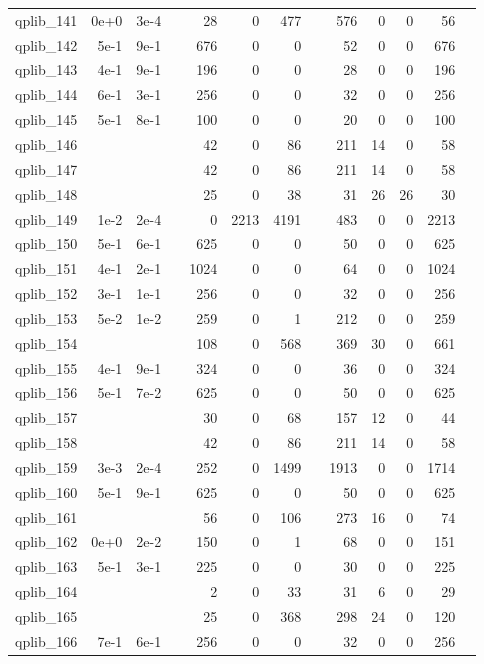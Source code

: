 \begin{table}
\begin{tabular}{lrrrrrrrrrrrr}
qplib\_141	&	0e+0	&	3e-4	&	&	28	&	0	&	477	&	&	576	&	0	&	0	&	56	\\
qplib\_142	&	5e-1	&	9e-1	&	&	676	&	0	&	0	&	&	52	&	0	&	0	&	676	\\
qplib\_143	&	4e-1	&	9e-1	&	&	196	&	0	&	0	&	&	28	&	0	&	0	&	196	\\
qplib\_144	&	6e-1	&	3e-1	&	&	256	&	0	&	0	&	&	32	&	0	&	0	&	256	\\
qplib\_145	&	5e-1	&	8e-1	&	&	100	&	0	&	0	&	&	20	&	0	&	0	&	100	\\
qplib\_146	&		&		&	&	42	&	0	&	86	&	&	211	&	14	&	0	&	58	\\
qplib\_147	&		&		&	&	42	&	0	&	86	&	&	211	&	14	&	0	&	58	\\
qplib\_148	&		&		&	&	25	&	0	&	38	&	&	31	&	26	&	26	&	30	\\
qplib\_149	&	1e-2	&	2e-4	&	&	0	&	2213	&	4191	&	&	483	&	0	&	0	&	2213	\\
qplib\_150	&	5e-1	&	6e-1	&	&	625	&	0	&	0	&	&	50	&	0	&	0	&	625	\\
qplib\_151	&	4e-1	&	2e-1	&	&	1024	&	0	&	0	&	&	64	&	0	&	0	&	1024	\\
qplib\_152	&	3e-1	&	1e-1	&	&	256	&	0	&	0	&	&	32	&	0	&	0	&	256	\\
qplib\_153	&	5e-2	&	1e-2	&	&	259	&	0	&	1	&	&	212	&	0	&	0	&	259	\\
qplib\_154	&		&		&	&	108	&	0	&	568	&	&	369	&	30	&	0	&	661	\\
qplib\_155	&	4e-1	&	9e-1	&	&	324	&	0	&	0	&	&	36	&	0	&	0	&	324	\\
qplib\_156	&	5e-1	&	7e-2	&	&	625	&	0	&	0	&	&	50	&	0	&	0	&	625	\\
qplib\_157	&		&		&	&	30	&	0	&	68	&	&	157	&	12	&	0	&	44	\\
qplib\_158	&		&		&	&	42	&	0	&	86	&	&	211	&	14	&	0	&	58	\\
qplib\_159	&	3e-3	&	2e-4	&	&	252	&	0	&	1499	&	&	1913	&	0	&	0	&	1714	\\
qplib\_160	&	5e-1	&	9e-1	&	&	625	&	0	&	0	&	&	50	&	0	&	0	&	625	\\
qplib\_161	&		&		&	&	56	&	0	&	106	&	&	273	&	16	&	0	&	74	\\
qplib\_162	&	0e+0	&	2e-2	&	&	150	&	0	&	1	&	&	68	&	0	&	0	&	151	\\
qplib\_163	&	5e-1	&	3e-1	&	&	225	&	0	&	0	&	&	30	&	0	&	0	&	225	\\
qplib\_164	&		&		&	&	2	&	0	&	33	&	&	31	&	6	&	0	&	29	\\
qplib\_165	&		&		&	&	25	&	0	&	368	&	&	298	&	24	&	0	&	120	\\
qplib\_166	&	7e-1	&	6e-1	&	&	256	&	0	&	0	&	&	32	&	0	&	0	&	256	\\

\end{tabular}
\end{table}
